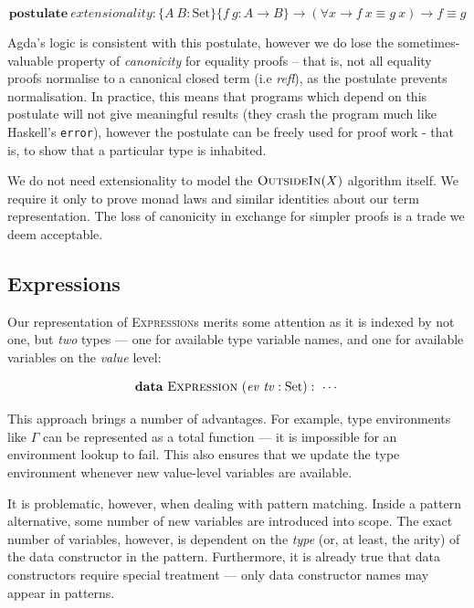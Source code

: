 \documentclass[a4paper]{jfp}
\newcommand{\outsidein}{\textsc{OutsideIn}(X)}
\begin{document}
\begin{displaymath}
	\textbf{postulate}\ \mathit{extensionality} : \{A\ B : \text{Set}\}\{f\ g : A \rightarrow B \} 
                   \rightarrow (\forall x \rightarrow f\ x \equiv g\ x) \rightarrow f \equiv g
\end{displaymath}

\medskip

Agda's logic is consistent with this postulate, however we do lose the sometimes-valuable property of \emph{canonicity} for equality proofs -- that
is, not all equality proofs normalise to a canonical closed term (i.e \emph{refl}), as the postulate prevents normalisation. In practice, this means
that programs which depend on this postulate will not give meaningful results (they crash the program much like Haskell's {\tt error}), however the
postulate can be freely used for proof work - that is, to show that a particular type is inhabited.

We do not need extensionality to model the $\outsidein$ algorithm itself. We require it only to prove monad laws and similar identities about our term
representation. The loss of canonicity in exchange for simpler proofs is a trade we deem acceptable.

\subsection{Expressions}

Our representation of \textsc{Expression}s merits some attention as it is indexed by not one, but \emph{two} types --- one for available type variable
names, and one for available variables on the \emph{value} level:

\begin{displaymath}
         \textbf{data}\ \textsc{Expression}\ (\mathit{ev}\ \mathit{tv} : \text{Set}) :\ \cdots
\end{displaymath}

This approach brings a number of advantages. For example, type environments like $\Gamma$ can be represented as a total function --- it is impossible
for an environment lookup to fail. This also ensures that we update the type environment whenever new value-level variables are available.

It is problematic, however, when dealing with pattern matching. Inside a pattern alternative, some number of new variables are introduced into scope.
The exact number of variables, however, is dependent on the \emph{type} (or, at least, the arity) of the data constructor in the pattern. Furthermore, it
is already true that data constructors require special treatment --- only data constructor names may appear in patterns. 
\end{document}
